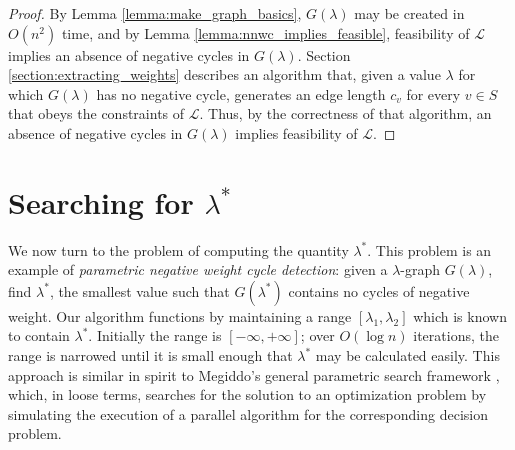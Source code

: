 \documentclass{llncs}
\begin{document}
\begin{proof}
By Lemma \ref{lemma:make_graph_basics}, $G(\lambda)$ may be created in $O(n^2)$ time, and by Lemma \ref{lemma:nnwc_implies_feasible}, feasibility of $\mathcal{L}$ implies an absence of negative cycles in $G(\lambda)$.  Section \ref{section:extracting_weights} describes an algorithm that, given a value $\lambda$ for which $G(\lambda)$ has no negative cycle, generates an edge length $c_v$ for every $v \in S$ that obeys the constraints of $\mathcal{L}$.  Thus, by the correctness of that algorithm, an absence of negative cycles in $G(\lambda)$ implies feasibility of $\mathcal{L}$.
\end{proof}

\section{Searching for $\lambda^*$}
\label{section:cycle_detection}

We now turn to the problem of computing the quantity $\lambda^*$.  This problem is an example of \emph{parametric negative weight cycle detection}: given a $\lambda$-graph $G(\lambda)$, find $\lambda^*$, the smallest value such that $G(\lambda^*)$ contains no cycles of negative weight.  Our algorithm functions by maintaining a range $[\lambda_1, \lambda_2]$ which is known to contain $\lambda^*$.  Initially the range is $[-\infty, +\infty]$; over $O(\log n)$ iterations, the range is narrowed until it is small enough that $\lambda^*$ may be calculated easily.  This approach is similar in spirit to Megiddo's general parametric search framework \cite{804326,322410}, which, in loose terms, searches for the solution to an optimization problem by simulating the execution of a parallel algorithm for the corresponding decision problem.
\end{document}
